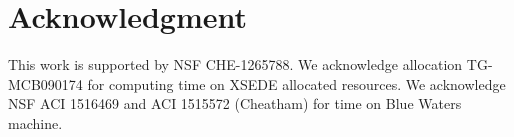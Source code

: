 \documentclass{sig-alternate-05-2015}
\begin{document}


\section*{Acknowledgment}

This work is supported by NSF CHE-1265788. We acknowledge allocation TG-MCB090174 for computing time on XSEDE allocated resources. We acknowledge NSF ACI 1516469 and ACI 1515572 (Cheatham) for time on Blue Waters machine.


\end{document}
